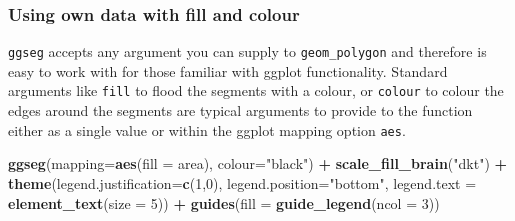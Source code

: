 \documentclass[fleqn,10pt]{wlpeerj} %
\newenvironment{Shaded}{\begin{snugshade}}{\end{snugshade}}
\newcommand{\DataTypeTok}[1]{\textcolor[rgb]{0.13,0.29,0.53}{#1}}
\newcommand{\DecValTok}[1]{\textcolor[rgb]{0.00,0.00,0.81}{#1}}
\newcommand{\KeywordTok}[1]{\textcolor[rgb]{0.13,0.29,0.53}{\textbf{#1}}}
\newcommand{\NormalTok}[1]{#1}
\newcommand{\OperatorTok}[1]{\textcolor[rgb]{0.81,0.36,0.00}{\textbf{#1}}}
\newcommand{\StringTok}[1]{\textcolor[rgb]{0.31,0.60,0.02}{#1}}
\begin{document}
\hypertarget{using-own-data-with-fill-and-colour}{%
\subsubsection{Using own data with fill and colour}\label{using-own-data-with-fill-and-colour}}

\texttt{ggseg} accepts any argument you can supply to \texttt{geom\_polygon} and therefore is easy to work with for those familiar with ggplot functionality.
Standard arguments like \texttt{fill} to flood the segments with a colour, or \texttt{colour} to colour the edges around the segments are typical arguments to provide to the function either as a single value or within the ggplot mapping option \texttt{aes}.

\begin{Shaded}
\begin{Highlighting}[]
\KeywordTok{ggseg}\NormalTok{(}\DataTypeTok{mapping=}\KeywordTok{aes}\NormalTok{(}\DataTypeTok{fill =}\NormalTok{ area), }\DataTypeTok{colour=}\StringTok{"black"}\NormalTok{) }\OperatorTok{+}\StringTok{ }
\StringTok{  }\KeywordTok{scale_fill_brain}\NormalTok{(}\StringTok{"dkt"}\NormalTok{) }\OperatorTok{+}
\StringTok{  }\KeywordTok{theme}\NormalTok{(}\DataTypeTok{legend.justification=}\KeywordTok{c}\NormalTok{(}\DecValTok{1}\NormalTok{,}\DecValTok{0}\NormalTok{),}
        \DataTypeTok{legend.position=}\StringTok{"bottom"}\NormalTok{,}
        \DataTypeTok{legend.text =} \KeywordTok{element_text}\NormalTok{(}\DataTypeTok{size =} \DecValTok{5}\NormalTok{)) }\OperatorTok{+}
\StringTok{  }\KeywordTok{guides}\NormalTok{(}\DataTypeTok{fill =} \KeywordTok{guide_legend}\NormalTok{(}\DataTypeTok{ncol =} \DecValTok{3}\NormalTok{))}
\end{Highlighting}
\end{Shaded}
\end{document}
